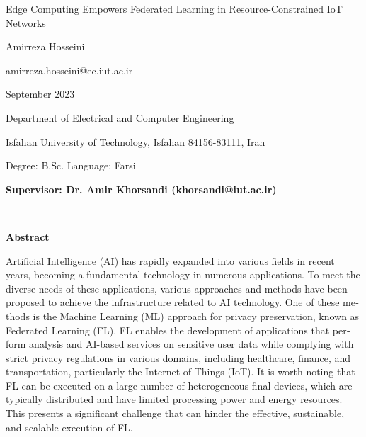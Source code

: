 \thispagestyle{empty}

\begin{latin}
\begin{center}

{\Huge Edge Computing Empowers Federated Learning in Resource-Constrained IoT Networks}

\vspace{1cm}

{\LARGE{Amirreza Hosseini}}

\vspace{0.2cm}

{\small amirreza.hosseini@ec.iut.ac.ir}

\vspace{0.5cm}

September 2023

\vspace{0.5cm}

Department of Electrical and Computer Engineering

\vspace{0.2cm}

Isfahan University of Technology, Isfahan 84156-83111, Iran

\vspace{0.2cm}

Degree: B.Sc. \hspace*{3cm} Language: Farsi

\vspace{1cm}

{\small\textbf{Supervisor: Dr. Amir Khorsandi (khorsandi@iut.ac.ir)}}
\end{center}
~\vfill



\noindent\textbf{Abstract}

\begin{small}
\baselineskip=0.6cm
Artificial Intelligence (AI) has rapidly expanded into various fields in recent years, becoming a fundamental technology in numerous applications. To meet the diverse needs of these applications, various approaches and methods have been proposed to achieve the infrastructure related to AI technology. One of these methods is the Machine Learning (ML) approach for privacy preservation, known as Federated Learning (FL). FL enables the development of applications that perform analysis and AI-based services on sensitive user data while complying with strict privacy regulations in various domains, including healthcare, finance, and transportation, particularly the Internet of Things (IoT).
It is worth noting that FL can be executed on a large number of heterogeneous final devices, which are typically distributed and have limited processing power and energy resources. This presents a significant challenge that can hinder the effective, sustainable, and scalable execution of FL.


\end{small}
\end{latin}
